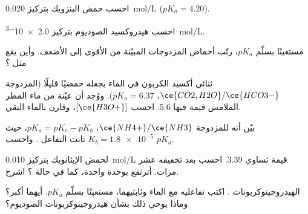 \begin{exercise}[$\star\star$]\label{exo:g12:ka-and-pka:7}
احسب  حمض البنزويك بتركيز \qty{0.020}{mol/L} ($pK_a = 4.20$).
\end{exercise}

\begin{exercise}[$\star\star$]\label{exo:g12:ka-and-pka:8}
احسب   هيدروكسيد الصوديوم بتركيز \qty{2.0e-3}{mol/L}.
\end{exercise}

\begin{exercise}[$\star\star$]\label{exo:g12:ka-and-pka:9}
مستعينًا بسلّم $pK_a$، رتّب أحماض المزدوجات المبيّنة من
الأقوى إلى الأضعف. وأين يقع  مثل ؟
\end{exercise}

\begin{exercise}[$\star\star$]\label{exo:g12:ka-and-pka:10}
ثنائي أكسيد الكربون  في الماء يجعله حمضيًا قليلًا (المزدوجة
$\ce{CO2,H2O}/\ce{HCO3-}$، $pK_a = 6.37$). ووُجد أن عيّنة من ماء المطر الملامس
 قيمة  فيها 5.6. احسب $[\ce{H3O+}]$، وقارن بالماء النقي.
\end{exercise}

\begin{exercise}[$\star\star$]\label{exo:g12:ka-and-pka:11}
بيّن أنه للمزدوجة $\ce{NH4+}/\ce{NH3}$، $pK_a = pK_e - pK_b$، حيث
$K_b = \num{1.8e-5}$ ثابت التفاعل .
واحسب $pK_a$.
\end{exercise}

\begin{exercise}[$\star\star\star$]\label{exo:g12:ka-and-pka:12}
لحمض الإيثانويك بتركيز \qty{0.010}{mol/L} قيمة  تساوي 3.39. احسب  بعد
تخفيفه عشر مرات. أترتفع بوحدة واحدة، كما في حالة ؟
اشرح.
\end{exercise}

\begin{exercise}[$\star\star\star$]\label{exo:g12:ka-and-pka:13}
 الهيدروجينوكربونات . اكتب تفاعليه مع
الماء وثابتيهما، مستعينًا بسلّم $pK_a$. أيهما أكبر؟
وماذا يوحي ذلك بشأن   هيدروجينوكربونات
الصوديوم؟
\end{exercise}

